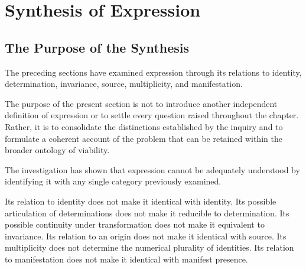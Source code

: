 %
%

\section{Synthesis of Expression}
\label{sec:synthesis-of-expression}

\subsection{The Purpose of the Synthesis}

The preceding sections have examined expression through
its relations to identity, determination, invariance,
source, multiplicity, and manifestation.

The purpose of the present section is not to introduce
another independent definition of expression or to
settle every question raised throughout the chapter.
Rather, it is to consolidate the distinctions established
by the inquiry and to formulate a coherent account
of the problem that can be retained within the broader
ontology of viability.

The investigation has shown that expression cannot
be adequately understood by identifying it with any
single category previously examined.

Its relation to identity does not make it identical
with identity. Its possible articulation of determinations
does not make it reducible to determination. Its possible
continuity under transformation does not make it
equivalent to invariance. Its relation to an origin
does not make it identical with source. Its multiplicity
does not determine the numerical plurality of identities.
Its relation to manifestation does not make it identical
with manifest presence.

